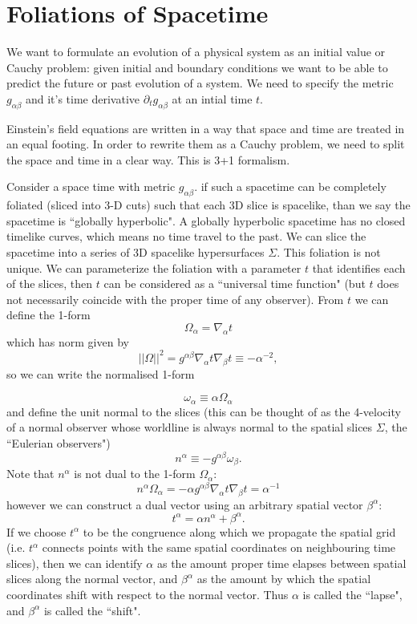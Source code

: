 \documentclass{article}
\def\pd{{\partial}}
\begin{document}
\section{Foliations of Spacetime}
We want to formulate an evolution of a physical system as an initial value or Cauchy problem: given initial and boundary conditions we want to be able to predict the future or past evolution of a system. We need to specify the metric $g_{\alpha \beta}$ and it's time derivative $\pd_t g_{\alpha \beta}$ at an intial time $t$. 

Einstein's field equations are written in a way that space and time are treated in an equal footing. In order to rewrite them as a Cauchy problem, we need to split the space and time in a clear way. This is 3+1 formalism.

Consider a space time with metric $g_{\alpha \beta}$. if such a spacetime can be completely foliated (sliced into 3-D cuts) such that each 3D slice is spacelike, than we say the spacetime is ``globally hyperbolic". A globally hyperbolic spacetime has no closed timelike curves, which means no time travel to the past. We can slice the spacetime into a series of 3D spacelike hypersurfaces $\Sigma$. This foliation is not unique. We can parameterize the foliation with a parameter $t$ that identifies each of the slices, then $t$ can be considered as a ``universal time function" (but $t$ does not necessarily coincide with the proper time of any observer). From $t$ we can define the 1-form
\[ \Omega_\alpha = \nabla_\alpha t\]
which has norm given by 
\[ ||\Omega||^2 = g^{\alpha \beta} \nabla_\alpha t \nabla_\beta t \equiv -\alpha^{-2}, \]
so we can write the normalised 1-form

\[ \omega_\alpha \equiv \alpha \Omega_\alpha \]
 and define the unit normal to the slices (this can be thought of as the 4-velocity of a normal observer whose worldline is always normal to the spatial slices $\Sigma$, the ``Eulerian observers")
\[ n^\alpha \equiv -g^{\alpha \beta} \omega_\beta. \]
Note that $n^\alpha$ is not dual to the 1-form $\Omega_\alpha$:
\[ n^\alpha \Omega_\alpha = -\alpha g^{\alpha \beta} \nabla_\alpha t \nabla_\beta t = \alpha^{-1} \]
however we can construct a dual vector using an arbitrary spatial vector $\beta^\alpha$:
\[ t^\alpha = \alpha n^\alpha + \beta^\alpha. \]
If we choose $t^\alpha$ to be the congruence along which we propagate the spatial grid (i.e. $t^\alpha$ connects points with the same spatial coordinates on neighbouring time slices), then we can identify $\alpha$ as the amount proper time elapses between spatial slices along the normal vector, and $\beta^\alpha$ as the amount by which the spatial coordinates shift with respect to the normal vector. Thus $\alpha$ is called the ``lapse", and $\beta^\alpha$ is called the ``shift". 
\end{document}
